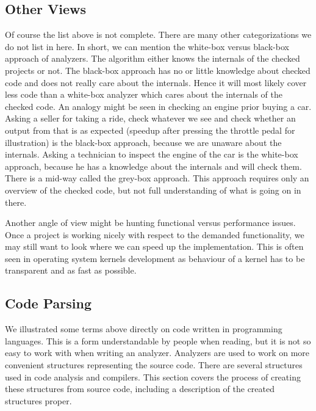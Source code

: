 \subsection{Other Views}
Of course the list above is not complete. There are many other categorizations
we do not list in here. In short, we can mention the white-box versus
black-box approach of analyzers. The algorithm either knows the internals of
the checked projects or not.  The black-box approach has no or little
knowledge about checked code and does not really care about the internals.
Hence it will most likely cover less code than a white-box analyzer which
cares about the internals of the checked code.  An analogy might be seen in
checking an engine prior buying a car.  Asking a seller for taking a ride,
check whatever we see and check whether an output from that is as expected
(speedup after pressing the throttle pedal for illustration) is the black-box
approach, because we are unaware about the internals. Asking a technician to
inspect the engine of the car is the white-box approach, because he has a
knowledge about the internals and will check them.  There is a mid-way called
the grey-box approach. This approach requires only an overview of the checked
code, but not full understanding of what is going on in there.

Another angle of view might be hunting functional versus performance issues.
Once a project is working nicely with respect to the demanded functionality,
we may still want to look where we can speed up the implementation. This is
often seen in operating system kernels development as behaviour of a kernel
has to be transparent and as fast as possible.

\subsection{Code Parsing}
We illustrated some terms above directly on code written in programming
languages. This is a form understandable by people when reading, but it is not
so easy to work with when writing an analyzer. Analyzers are used to work on
more convenient structures representing the source code.  There are several
structures used in code analysis and compilers.  This section covers the
process of creating these structures from source code, including a description
of the created structures proper.


